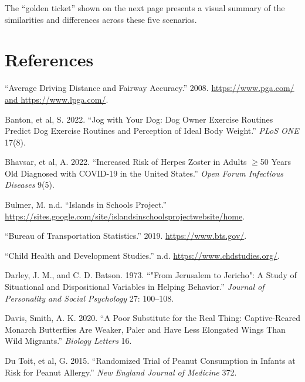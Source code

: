 \documentclass[
]{report}
\newlength{\cslhangindent}
\newenvironment{CSLReferences}[2] %
 {\begin{list}{}{%
  \setlength{\itemindent}{0pt}
  \setlength{\leftmargin}{0pt}
  \setlength{\parsep}{0pt}
  \ifodd #1
   \setlength{\leftmargin}{\cslhangindent}
   \setlength{\itemindent}{-1\cslhangindent}
  \fi
  \setlength{\itemsep}{#2\baselineskip}}}
 {\end{list}}
\begin{document}
The ``golden ticket'' shown on the next page presents a visual summary of the similarities and differences across these five scenarios.



\chapter*{References}\label{references}

\label{refs}
\begin{CSLReferences}{1}{0}
{``Average Driving Distance and Fairway Accuracy.''} 2008. \href{https://www.pga.com/\%20and\%20https://www.lpga.com/}{https://www.pga.com/ and https://www.lpga.com/}.

Banton, et al, S. 2022. {``Jog with Your Dog: Dog Owner Exercise Routines Predict Dog Exercise Routines and Perception of Ideal Body Weight.''} \emph{PLoS ONE} 17(8).

Bhavsar, et al, A. 2022. {``Increased Risk of Herpes Zoster in Adults \(\geq\)50 Years Old Diagnosed with COVID-19 in the United States.''} \emph{Open Forum Infectious Diseases} 9(5).

Bulmer, M. n.d. {``Islands in Schools Project.''} \url{https://sites.google.com/site/islandsinschoolsprojectwebsite/home}.

{``Bureau of Transportation Statistics.''} 2019. \url{https://www.bts.gov/}.

{``Child Health and Development Studies.''} n.d. \url{https://www.chdstudies.org/}.

Darley, J. M., and C. D. Batson. 1973. {``"From Jerusalem to Jericho": A Study of Situational and Dispositional Variables in Helping Behavior.''} \emph{Journal of Personality and Social Psychology} 27: 100--108.

Davis, Smith, A. K. 2020. {``A Poor Substitute for the Real Thing: Captive-Reared Monarch Butterflies Are Weaker, Paler and Have Less Elongated Wings Than Wild Migrants.''} \emph{Biology Letters} 16.

Du Toit, et al, G. 2015. {``Randomized Trial of Peanut Consumption in Infants at Risk for Peanut Allergy.''} \emph{New England Journal of Medicine} 372.


\end{CSLReferences}
\end{document}
